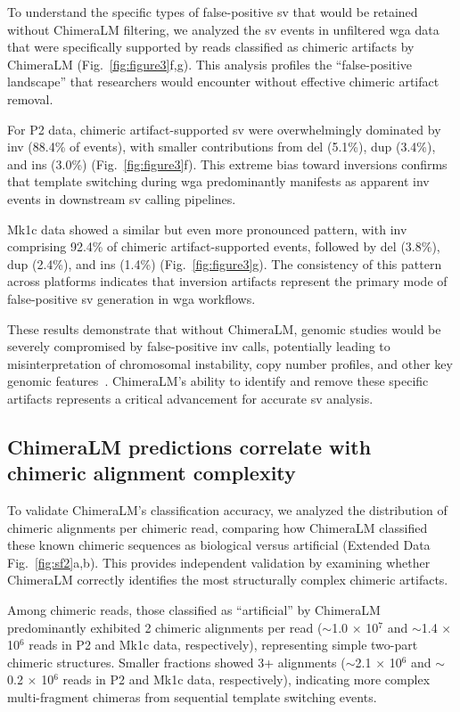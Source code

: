 \documentclass[pdflatex,sn-nature]{sn-jnl}%
\theoremstyle{thmstyleone}%
\theoremstyle{thmstyletwo}%
\theoremstyle{thmstylethree}%
\begin{document}
To understand the specific types of false-positive \gls{sv} that would be retained without ChimeraLM filtering, we analyzed the \gls{sv} events in unfiltered \gls{wga} data that were specifically supported by reads classified as chimeric artifacts by ChimeraLM (Fig.~\ref{fig:figure3}f,g).
This analysis profiles the ``false-positive landscape'' that researchers would encounter without effective chimeric artifact removal.

For P2 data, chimeric artifact-supported \gls{sv} were overwhelmingly dominated by \gls{inv} (88.4\% of events), with smaller contributions from \gls{del} (5.1\%), \gls{dup} (3.4\%), and \gls{ins} (3.0\%) (Fig.~\ref{fig:figure3}f).
This extreme bias toward inversions confirms that template switching during \gls{wga} predominantly manifests as apparent \gls{inv} events in downstream \gls{sv} calling pipelines.

Mk1c data showed a similar but even more pronounced pattern, with \gls{inv} comprising 92.4\% of chimeric artifact-supported events, followed by \gls{del} (3.8\%), \gls{dup} (2.4\%), and \gls{ins} (1.4\%) (Fig.~\ref{fig:figure3}g).
The consistency of this pattern across platforms indicates that inversion artifacts represent the primary mode of false-positive \gls{sv} generation in \gls{wga} workflows.

These results demonstrate that without ChimeraLM, genomic studies would be severely compromised by false-positive \gls{inv} calls, potentially leading to misinterpretation of chromosomal instability, copy number profiles, and other key genomic features~\cite{kosugi2019comprehensive, mahmoud2019structural}.
ChimeraLM's ability to identify and remove these specific artifacts represents a critical advancement for accurate \gls{sv} analysis.

\subsection*{ChimeraLM predictions correlate with chimeric alignment complexity}

To validate ChimeraLM's classification accuracy, we analyzed the distribution of chimeric alignments per chimeric read, comparing how ChimeraLM classified these known chimeric sequences as biological versus artificial (Extended Data Fig.~\ref{fig:sf2}a,b).
This provides independent validation by examining whether ChimeraLM correctly identifies the most structurally complex chimeric artifacts.

Among chimeric reads, those classified as ``artificial'' by ChimeraLM predominantly exhibited 2 chimeric alignments per read ($\sim$1.0 $\times$ 10$^7$ and $\sim$1.4 $\times$ 10$^6$ reads in P2 and Mk1c data, respectively), representing simple two-part chimeric structures.
Smaller fractions showed 3+ alignments ($\sim$2.1 $\times$ 10$^6$ and $\sim$0.2 $\times$ 10$^6$ reads in P2 and Mk1c data, respectively), indicating more complex multi-fragment chimeras from sequential template switching events.
\end{document}
